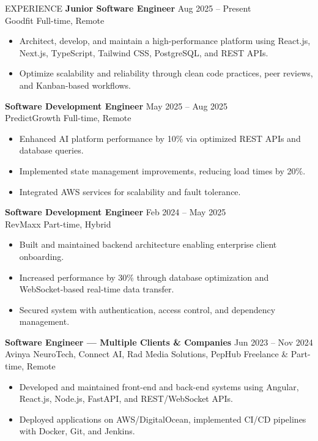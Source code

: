 \documentclass{resume}
\begin{document}
\begin{rSection}{EXPERIENCE}
	{\bf Junior Software Engineer} \hfill {Aug 2025 -- Present}\\
	Goodfit \hfill {Full-time, Remote}
	\begin{itemize}
		\item Architect, develop, and maintain a high-performance platform using React.js, Next.js, TypeScript, Tailwind CSS, PostgreSQL, and REST APIs.
		\item Optimize scalability and reliability through clean code practices, peer reviews, and Kanban-based workflows.
	\end{itemize}
	{\bf Software Development Engineer} \hfill {May 2025 -- Aug 2025}\\
	PredictGrowth \hfill {Full-time, Remote}
	\begin{itemize}
		\item Enhanced AI platform performance by 10\% via optimized REST APIs and database queries.
		\item Implemented state management improvements, reducing load times by 20\%.
		\item Integrated AWS services for scalability and fault tolerance.
	\end{itemize}
	{\bf Software Development Engineer} \hfill {Feb 2024 -- May 2025}\\
	RevMaxx \hfill {Part-time, Hybrid}
	\begin{itemize}
		\item Built and maintained backend architecture enabling enterprise client onboarding.
		\item Increased performance by 30\% through database optimization and WebSocket-based real-time data transfer.
		\item Secured system with authentication, access control, and dependency management.
	\end{itemize}
	{\bf Software Engineer — Multiple Clients \& Companies} \hfill {Jun 2023 -- Nov 2024}\\
	Avinya NeuroTech, Connect AI, Rad Media Solutions, PepHub \hfill {Freelance \& Part-time, Remote}
	\begin{itemize}
		\item Developed and maintained front-end and back-end systems using Angular, React.js, Node.js, FastAPI, and REST/WebSocket APIs.
		\item Deployed applications on AWS/DigitalOcean, implemented CI/CD pipelines with Docker, Git, and Jenkins.
	\end{itemize}
\end{rSection}
\end{document}
